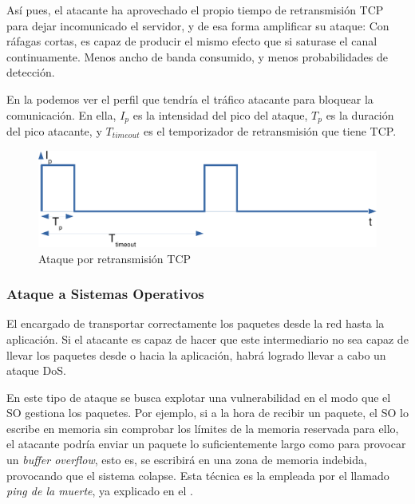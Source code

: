 Así pues, el atacante ha aprovechado el propio tiempo de retransmisión \gls{TCP} para dejar incomunicado el servidor, y 
de esa forma amplificar su ataque: Con ráfagas cortas, es capaz de producir el mismo efecto que si saturase el canal 
continuamente. Menos ancho de banda consumido, y menos probabilidades de detección.

En la  podemos ver el perfil que tendría el tráfico atacante para bloquear la comunicación. En ella, 
$I_p$ es la intensidad del pico del ataque, $T_p$ es la duración del pico atacante, y $T_{timeout}$ es el temporizador 
de retransmisión que tiene \gls{TCP}.

\begin{figure}[htbp]
\centering
\includegraphics[width=\textwidth]{CapituloDDoS/Figuras/RTO_attack}
\caption{Ataque por retransmisión TCP}
\end{figure}
%

\subsubsection{Ataque a Sistemas Operativos}

El encargado de transportar correctamente los paquetes desde la red hasta la aplicación. Si el atacante es capaz de 
hacer que este intermediario no sea capaz de llevar los paquetes desde o hacia la aplicación, habrá logrado llevar a 
cabo un ataque \gls{DoS}.

En este tipo de ataque se busca explotar una vulnerabilidad en el modo que el \gls{SO} gestiona los paquetes. Por 
ejemplo, si a la hora de recibir un paquete, el \gls{SO} lo escribe en memoria sin comprobar los límites de la memoria 
reservada para ello, el atacante podría enviar un paquete lo suficientemente largo como para provocar un \emph{buffer 
overflow}, esto es, se escribirá en una zona de memoria indebida, provocando que el sistema 
colapse. Esta técnica es la empleada por el llamado \emph{ping de la muerte}, ya explicado en 
el .

